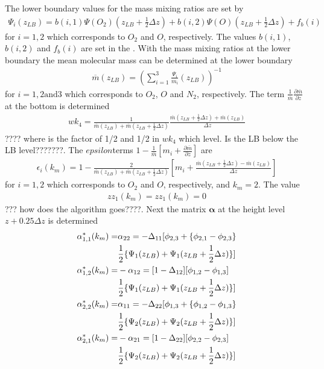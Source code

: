 The lower boundary values for the mass mixing ratios are set by
%
\begin{align}
  \Psi_i(z_{LB}) = b(i,1) \Psi(O_2)(z_{LB}+\frac{1}{2}\Delta z) +
   b(i,2) \Psi(O)(z_{LB}+\frac{1}{2}\Delta z) + f_b(i)
\end{align}
%
for $i = 1, 2$ which corresponds to $O_2$ and $O$, respectively. The
values $b(i,1)$, $b(i,2)$ and $f_b(i)$ are set in the
. With the mass mixing ratios at the lower
boundary the mean molecular mass can be determined at the lower
boundary
%
\begin{align}
 \overline{m} (z_{LB}) = \left( \sum_{i=1}^3 \frac{\Psi_i}{m_i}(z_{LB})  \right)^{-1}
\end{align}
%
for $i = 1, 2 \text{and} 3$ which corresponds to $O_2$, $O$ and
$N_2$, respectively. The term $\frac{1}{\overline{m}}\frac{\partial
\overline{m}}{\partial z}$ at the bottom is determined
%
\begin{align}
   wk_4  = \frac{1}{\overline{m}(z_{LB}) +\overline{m}(z_{LB}+\frac{1}{2}\Delta z) }
      \frac{\overline{m}(z_{LB}+\frac{1}{2}\Delta z) +\overline{m}(z_{LB})}{\Delta z}
\end{align}
%
???? where is the factor of 1/2 and 1/2 in $wk_4$ which level. Is
the LB below the LB level???????. The $epsilon $terms $1-
\frac{1}{\overline{m}}[{m_i} + \frac{\partial \overline{m}}{\partial
z}]$ are
%
\begin{align}
   \epsilon_{i}(k_m) = 1- \frac{2}{\overline{m}(z_{LB}) +
       \overline{m}(z_{LB}+\frac{1}{2}\Delta z)}[{m_i} +
     \frac{\overline{m}(z_{LB}+\frac{1}{2}\Delta z) -
      \overline{m}(z_{LB})}{\Delta z}]
\end{align}
%
for $i = 1, 2$ which corresponds to $O_2$ and $O$, respectively, and
$k_m = 2$. The value
%
\begin{align}
  zz_{1}(k_m) = zz_{1}(k_m) = 0
\end{align}
%
??? how does the algorithm goes????. Next the matrix
$\mathbf{\alpha}$ at the height level $z+0.25\Delta z$ is determined
%
\begin{align}
   \alpha^*_{1,1}(k_m) = & \alpha_{22} = -\Delta_{11}[\phi_{2,3}+\{\phi_{2,1}-\phi_{2,3}\} \notag \\
                         & \frac{1}{2} \{ \Psi_1(z_{LB}) + \Psi_1(z_{LB}+\frac{1}{2}\Delta
                         z)\}] \\
   \alpha^*_{1,2}(k_m) = & -\alpha_{12} = [1-\Delta_{12}][\phi_{1,2}- \phi_{1,3}] \notag \\
                         & \frac{1}{2} \{ \Psi_1(z_{LB}) + \Psi_1(z_{LB}+\frac{1}{2}\Delta
                         z)\}] \\
   \alpha^*_{2,2}(k_m) = & \alpha_{11} = -\Delta_{22}[\phi_{1,3}+\{\phi_{1,2}-\phi_{1,3}\} \notag \\
                         & \frac{1}{2} \{ \Psi_2(z_{LB}) + \Psi_2(z_{LB}+\frac{1}{2}\Delta
                         z)\}]\\
   \alpha^*_{2,1}(k_m) = & -\alpha_{21} = [1-\Delta_{22}][\phi_{2,2}- \phi_{2,3}] \notag \\
                         & \frac{1}{2} \{ \Psi_2(z_{LB}) + \Psi_2(z_{LB}+\frac{1}{2}\Delta z)\}]
\end{align}
